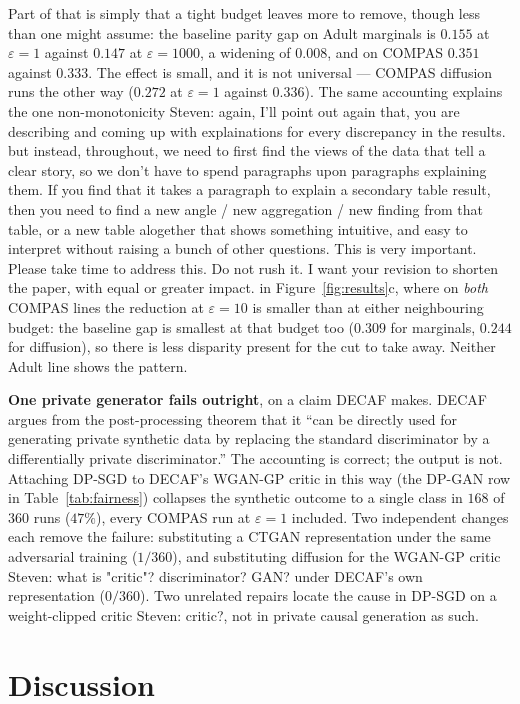 \documentclass{article}
\newcommand{\s}[1]{\textcolor{Dandelion}{Steven: #1}}
\begin{document}
Part of that is simply that a tight budget leaves more to remove, though less
than one might assume: the baseline parity gap on Adult marginals is $0.155$
at $\varepsilon{=}1$ against $0.147$ at $\varepsilon{=}1000$, a widening of
$0.008$, and on COMPAS $0.351$ against $0.333$. The effect is small, and it is
not universal --- COMPAS diffusion runs the other way ($0.272$ at
$\varepsilon{=}1$ against $0.336$). The same accounting explains the one
non-monotonicity \s{again, I'll point out again that, you are describing and coming up with explainations for every discrepancy in the results. but instead, throughout, we need to first find the views of the data that tell a clear story, so we don't have to spend paragraphs upon paragraphs explaining them. If you find that it takes a paragraph to explain a secondary table result, then you need to find a new angle / new aggregation / new finding from that table, or a new table alogether that shows something intuitive, and easy to interpret without raising a bunch of other questions. This is very important. Please take time to address this. Do not rush it. I want your revision to shorten the paper, with equal or greater impact.} in Figure~\ref{fig:results}c, where on \emph{both} COMPAS
lines the reduction at $\varepsilon{=}10$ is smaller than at either
neighbouring budget: the baseline gap is smallest at that budget too ($0.309$
for marginals, $0.244$ for diffusion), so there is less disparity present for
the cut to take away. Neither Adult line shows the pattern.


\textbf{One private generator fails outright}, on a claim DECAF makes. DECAF
argues from the post-processing theorem that it ``can be directly used for
generating private synthetic data by replacing the standard discriminator by
a differentially private discriminator.'' The accounting is correct; the
output is not. Attaching DP-SGD \citep{abadi2016dpsgd} to DECAF's WGAN-GP
critic in this way (the DP-GAN row in Table~\ref{tab:fairness}) collapses
the synthetic outcome to a single class in $168$ of $360$ runs ($47\%$),
every COMPAS run at $\varepsilon{=}1$ included. Two independent changes each
remove the failure: substituting a CTGAN representation under the same
adversarial training ($1/360$), and substituting diffusion for the WGAN-GP
critic \s{what is "critic"? discriminator? GAN?} under DECAF's own representation ($0/360$). Two unrelated repairs
locate the cause in DP-SGD on a weight-clipped critic \s{critic?}, not in private causal
generation as such.

\section{Discussion}
\label{sec:discussion}
\wkDiscussion





\end{document}
